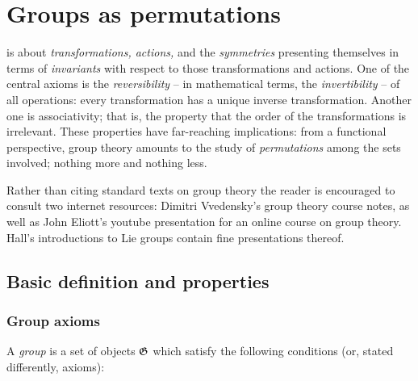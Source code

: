 \chapter{Groups as permutations}
\label{2012-m-ch-gt}

 is about {\em transformations, actions,} and the {\em symmetries} presenting themselves in terms of {\em invariants} with respect to those transformations and actions.
One of the central axioms is the {\em reversibility} -- in mathematical terms, the {\em invertibility} -- of all operations: every transformation has a unique inverse transformation.
Another one is associativity; that is, the property that the order of the transformations is irrelevant.
These properties have far-reaching implications: from a functional perspective, group theory amounts to the study of {\em permutations} among the sets involved; nothing more and nothing less.

Rather than citing standard texts on group theory\cite{rotman} the reader is encouraged to consult
two internet resources: Dimitri Vvedensky's group theory course notes,\cite{vvedensky-grouptheory}
as well as
John Eliott's youtube presentation\cite{eliott-gt-yt} for an online course on group theory.
Hall's introductions to Lie groups\cite{hall-2000,hall-2015} contain fine presentations thereof.


\section{Basic definition and properties}

\subsection{Group axioms}

A {\em group} is a set of objects ${\frak G}$ which satisfy the following conditions (or, stated differently, axioms):

